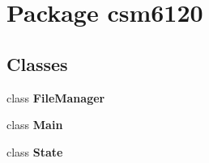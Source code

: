\section{Package csm6120}
\label{namespacecsm6120}
\subsection*{Classes}
\begin{DoxyCompactItemize}
\item 
class {\bf File\+Manager}
\item 
class {\bf Main}
\item 
class {\bf State}
\end{DoxyCompactItemize}
